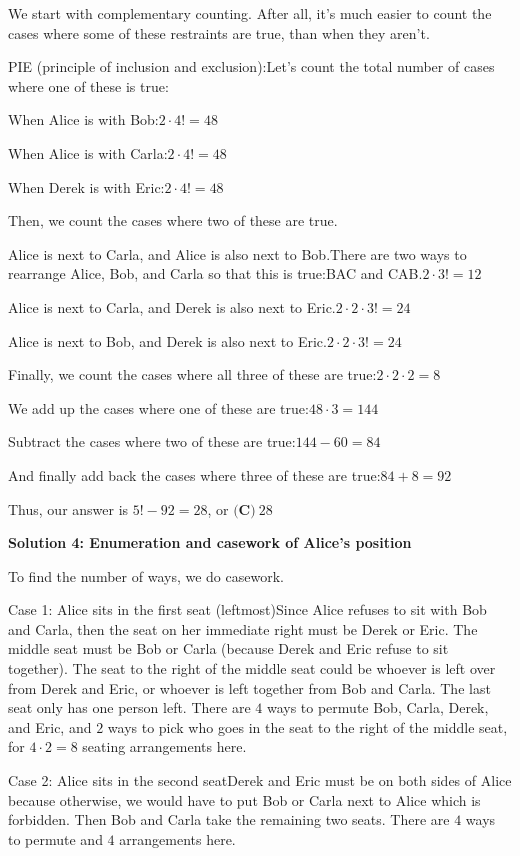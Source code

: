 \begin{enumerate}
We start with complementary counting. After all, it's much easier to count the cases where some of these restraints are true, than when they aren't.

 PIE (principle of inclusion and exclusion):Let's count the total number of cases where one of these is true:

 When Alice is with Bob:$2\cdot4!=48$

 When Alice is with Carla:$2\cdot4!=48$

 When Derek is with Eric:$2\cdot4!=48$

 Then, we count the cases where two of these are true.

 Alice is next to Carla, and Alice is also next to Bob.There are two ways to rearrange Alice, Bob, and Carla so that this is true:BAC and CAB.$2\cdot3!=12$

 Alice is next to Carla, and Derek is also next to Eric.$2\cdot2\cdot3!=24$

 Alice is next to Bob, and Derek is also next to Eric.$2\cdot2\cdot3!=24$

 Finally, we count the cases where all three of these are true:$2\cdot2\cdot2=8$

 We add up the cases where one of these are true:$48\cdot3=144$

 Subtract the cases where two of these are true:$144-60=84$

 And finally add back the cases where three of these are true:$84+8=92$

 Thus, our answer is $5!-92=28$, or $\boxed{\textbf{(C)} ~28}$




\textbf{Solution 4: Enumeration and casework of Alice's position}

To find the number of ways, we do casework.

 Case 1: Alice sits in the first seat (leftmost)Since Alice refuses to sit with Bob and Carla, then the seat on her immediate right must be Derek or Eric. The middle seat must be Bob or Carla (because Derek and Eric refuse to sit together). The seat to the right of the middle seat could be whoever is left over from Derek and Eric, or whoever is left together from Bob and Carla. The last seat only has one person left. There are $4$ ways to permute Bob, Carla, Derek, and Eric, and $2$ ways to pick who goes in the seat to the right of the middle seat, for $4\cdot2=8$ seating arrangements here.

 Case 2: Alice sits in the second seatDerek and Eric must be on both sides of Alice because otherwise, we would have to put Bob or Carla next to Alice which is forbidden. Then Bob and Carla take the remaining two seats. There are $4$ ways to permute and $4$ arrangements here.


\end{enumerate}
